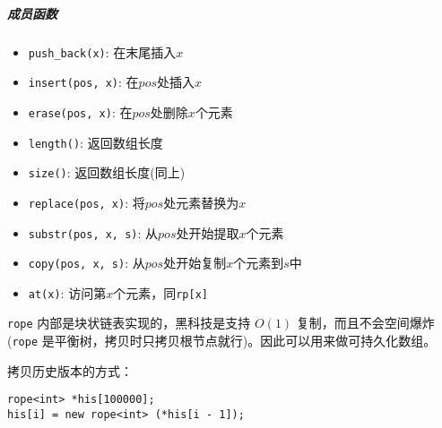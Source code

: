 \documentclass[]{article}
\let\oldsubparagraph\subparagraph
\renewcommand{\subparagraph}[1]{\oldsubparagraph{#1}\mbox{}}
\begin{document}
\hypertarget{ux6210ux5458ux51fdux6570-2}{%
\subparagraph{成员函数}\label{ux6210ux5458ux51fdux6570-2}}

\begin{itemize}
\item
  \texttt{push\_back(x)}: 在末尾插入\(x\)
\item
  \texttt{insert(pos,\ x)}: 在\(pos\)处插入\(x\)
\item
  \texttt{erase(pos,\ x)}: 在\(pos\)处删除\(x\)个元素
\item
  \texttt{length()}: 返回数组长度
\item
  \texttt{size()}: 返回数组长度(同上)
\item
  \texttt{replace(pos,\ x)}: 将\(pos\)处元素替换为\(x\)
\item
  \texttt{substr(pos,\ x,\ s)}: 从\(pos\)处开始提取\(x\)个元素
\item
  \texttt{copy(pos,\ x,\ s)}: 从\(pos\)处开始复制\(x\)个元素到\(s\)中
\item
  \texttt{at(x)}: 访问第\(x\)个元素，同\texttt{rp{[}x{]}}
\end{itemize}

\texttt{rope} 内部是块状链表实现的，黑科技是支持 \(O(1)\)
复制，而且不会空间爆炸 (\texttt{rope}
是平衡树，拷贝时只拷贝根节点就行)。因此可以用来做可持久化数组。

拷贝历史版本的方式：

\begin{verbatim}
rope<int> *his[100000];
his[i] = new rope<int> (*his[i - 1]);
\end{verbatim}
\end{document}
